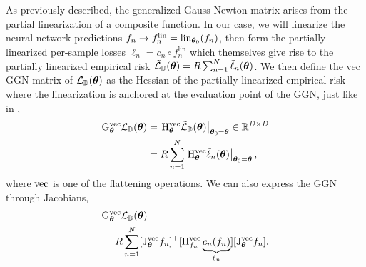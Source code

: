 As previously described, the generalized Gauss-Newton matrix arises from the partial linearization of a composite function.
In our case, we will linearize the neural network predictions $f_n \to f_n^{\text{lin}} = \lin_{\vtheta_0}(f_n)$, then form the partially-linearized per-sample losses $\tilde{\ell}_n = c_n \circ f_n^{\text{lin}}$ which themselves give rise to the partially linearized empirical risk $\tilde{\gL}_{\sD}(\vtheta) = R \sum_{n=1}^{N} \tilde{\ell}_n(\vtheta)$.
We then define the vec GGN matrix of $\gL_{\sD}(\vtheta)$ as the Hessian of the partially-linearized empirical risk where the linearization is anchored at the evaluation point of the GGN, just like in ,
\begin{align*}
  \ggn^{\vec}_{\vtheta} \gL_{\sD}(\vtheta)
  &=
  \left.\hess_{\vtheta}^{\vec} \tilde{\gL}_{\sD}(\vtheta)\right|_{\vtheta_0 = \vtheta} \in \sR^{D \times D}
    \\
  &=
    R \sum_{n=1}^N
    \left.\hess_{\vtheta}^{\vec} \tilde{\ell}_n(\vtheta)\right|_{\vtheta_0 = \vtheta},
\end{align*}
where $\vec$ is one of the flattening operations.
We can also express the GGN through Jacobians,
\begin{align*}
  &\ggn^{\vec}_{\vtheta} \gL_{\sD}(\vtheta)
  \\
  &=
  R \sum_{n=1}^N
  [\jac_{\vtheta}^{\vec} f_n]^{\top}
  [\hess^{\vec}_{f_n} \underbrace{c_n(f_n)}_{\ell_n}]
  [\jac_{\vtheta}^{\vec} f_n].
\end{align*}

